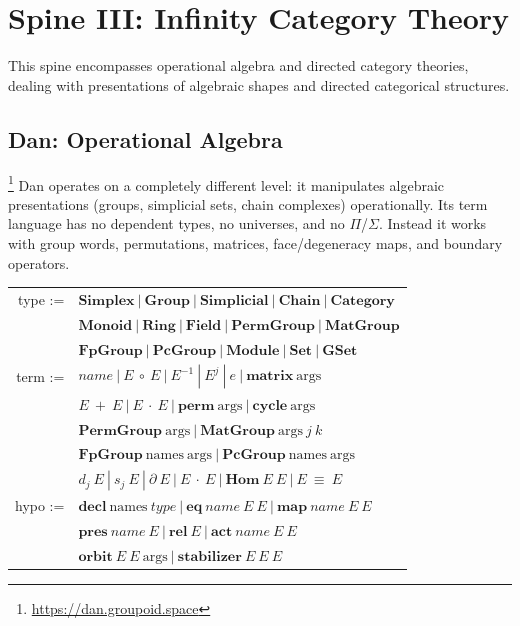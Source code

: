 \documentclass{article}
\theoremstyle{definition}
\theoremstyle{plain}
\begin{document}
\newpage
\section{Spine III: Infinity Category Theory}
This spine encompasses operational algebra and directed category theories, dealing with presentations of algebraic shapes and directed categorical structures.

\subsection{Dan: Operational Algebra \cite{birkedal2011first}}\footnote{\url{https://dan.groupoid.space}}
Dan operates on a completely different level: it manipulates algebraic
presentations (groups, simplicial sets, chain complexes) operationally.
Its term language has no dependent types, no universes, and no $\Pi$/$\Sigma$.
Instead it works with group words, permutations, matrices, face/degeneracy
maps, and boundary operators.

\begin{table}[ht!]
\centering
\begin{tabular}{rl}
    type :=&$\textbf{Simplex}\ |\ \textbf{Group}\ |\ \textbf{Simplicial}\ |\ \textbf{Chain}\ |\ \textbf{Category}$ \\
         &$\textbf{Monoid}\ |\ \textbf{Ring}\ |\ \textbf{Field}\ |\ \textbf{PermGroup}\ |\ \textbf{MatGroup}$ \\
         &$\textbf{FpGroup}\ |\ \textbf{PcGroup}\ |\ \textbf{Module}\ |\ \textbf{Set}\ |\ \textbf{GSet}$ \\
    term :=&$name\ |\ E\ \circ\ E\ |\ E^{-1}\ |\ E^j\ |\ e\ |\ \textbf{matrix}\ \textrm{args}$ \\
         &$E\ +\ E\ |\ E\ \cdot\ E\ |\ \textbf{perm}\ \textrm{args}\ |\ \textbf{cycle}\ \textrm{args}$ \\
         &$\textbf{PermGroup}\ \textrm{args}\ |\ \textbf{MatGroup}\ \textrm{args}\ j\ k$ \\
         &$\textbf{FpGroup}\ \textrm{names}\ \textrm{args}\ |\ \textbf{PcGroup}\ \textrm{names}\ \textrm{args}$ \\
         &$d_j\ E\ |\ s_j\ E\ |\ \partial\ E\ |\ E\ \cdot\ E\ |\ \textbf{Hom}\ E\ E\ |\ E\ \equiv\ E$ \\
    hypo :=&$\textbf{decl}\ \textrm{names}\ type\ |\ \textbf{eq}\ name\ E\ E\ |\ \textbf{map}\ name\ E\ E$ \\
         &$\textbf{pres}\ name\ E\ |\ \textbf{rel}\ E\ |\ \textbf{act}\ name\ E\ E$ \\
         &$\textbf{orbit}\ E\ E\ \textrm{args}\ |\ \textbf{stabilizer}\ E\ E\ E$ \\
\end{tabular}
\end{table}
\end{document}
